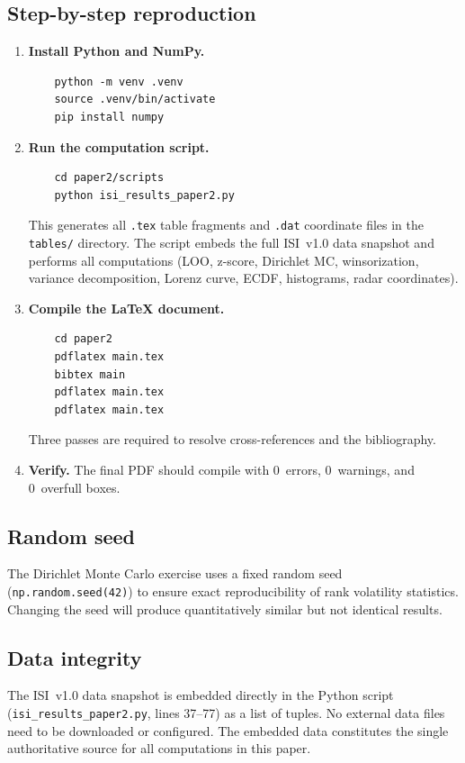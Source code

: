 \subsection{Step-by-step reproduction}

\begin{enumerate}[leftmargin=2em]
  \item \textbf{Install Python and NumPy.}
    \begin{verbatim}
    python -m venv .venv
    source .venv/bin/activate
    pip install numpy
    \end{verbatim}

  \item \textbf{Run the computation script.}
    \begin{verbatim}
    cd paper2/scripts
    python isi_results_paper2.py
    \end{verbatim}
    This generates all \texttt{.tex} table fragments and
    \texttt{.dat} coordinate files in the \texttt{tables/} directory.
    The script embeds the full ISI~v1.0 data snapshot and performs
    all computations (LOO, z-score, Dirichlet MC, winsorization,
    variance decomposition, Lorenz curve, ECDF, histograms, radar
    coordinates).

  \item \textbf{Compile the LaTeX document.}
    \begin{verbatim}
    cd paper2
    pdflatex main.tex
    bibtex main
    pdflatex main.tex
    pdflatex main.tex
    \end{verbatim}
    Three passes are required to resolve cross-references and the
    bibliography.

  \item \textbf{Verify.}  The final PDF should compile with
    0~errors, 0~warnings, and 0~overfull boxes.
\end{enumerate}

\subsection{Random seed}

The Dirichlet Monte Carlo exercise uses a fixed random seed
(\texttt{np.random.seed(42)}) to ensure exact reproducibility of
rank volatility statistics.  Changing the seed will produce
quantitatively similar but not identical results.

\subsection{Data integrity}

\begin{sloppypar}
The ISI~v1.0 data snapshot is embedded directly in the Python
script (\texttt{isi\_results\_\allowbreak paper2.py},
lines 37--77) as a list of tuples.
No external data files need to be downloaded or configured.  The
embedded data constitutes the single authoritative source for all
computations in this paper.
\end{sloppypar}
